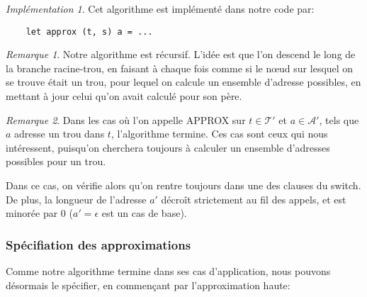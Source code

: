 \documentclass[11pt,a4paper]{article}
\theoremstyle{plain}
\theoremstyle{definition}
\theoremstyle{remark}
\newtheorem{remark}{Remarque}
\newtheorem{implementation}{Implémentation}
\newcommand*{\treeaddresses}{\ensuremath{\mathcal{A'}}}
\newcommand*{\treespartial}{\ensuremath{\mathcal{T'}}}
\begin{document}
\begin{implementation}
    Cet algorithme est implémenté dans notre code par:
    \begin{verbatim}
    let approx (t, s) a = ...
    \end{verbatim}
\end{implementation}

\begin{remark}
    \label{algo_expl}
    Notre algorithme est récursif. L'idée est que l'on descend le long de la branche racine-trou, en faisant à chaque fois comme si le n\oe ud sur lesquel on se trouve était un trou, pour lequel on calcule un ensemble d'adresse possibles, en mettant à jour celui qu'on avait calculé pour son père.
\end{remark}

\begin{remark}
    Dans les cas où l'on appelle APPROX sur $t \in \treespartial$ et $a \in \treeaddresses$, tels que $a$ adresse un trou dans $t$, l'algorithme termine. Ces cas sont ceux qui nous intéressent, puisqu'on cherchera toujours à calculer un ensemble d'adresses possibles pour un trou.
    
    Dans ce cas, on vérifie alors qu'on rentre toujours dans une des clauses du switch. De plus, la longueur de l'adresse $a'$ décroît strictement au fil des appels, et est minorée par 0 ($a' = \epsilon$ est un cas de base).
\end{remark}

\subsubsection{Spécifiation des approximations}

Comme notre algorithme termine dans ses cas d'application, nous pouvons désormais le spécifier, en commençant par l'approximation haute:
\end{document}
